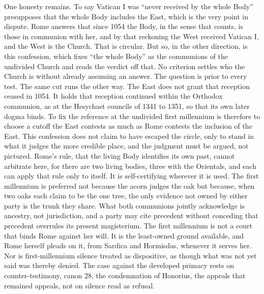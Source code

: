 \documentclass[11pt,twoside]{article}
\newcommand{\unit}[1]{\needspace{3\baselineskip}\par\medskip{\normalfont\bfseries\color{subhead}#1}\par\nobreak\smallskip}
\begin{document}
\unit{On the circle both sides stand in.}
One honesty remains. To say Vatican I was ``never received by the whole Body'' presupposes that the whole Body includes the East, which is the very point in dispute. Rome answers that since 1054 the Body, in the sense that counts, is those in communion with her, and by that reckoning the West received Vatican I, and the West is the Church. That is circular. But so, in the other direction, is this confession, which fixes ``the whole Body'' as the communions of the undivided Church and reads the verdict off that. No criterion settles who the Church is without already assuming an answer. The question is prior to every test. The same cut runs the other way. The East does not grant that reception ceased in 1054. It holds that reception continued within the Orthodox communion, as at the Hesychast councils of 1341 to 1351, so that its own later dogma binds. To fix the reference at the undivided first millennium is therefore to choose a cutoff the East contests as much as Rome contests the inclusion of the East. This confession does not claim to have escaped the circle, only to stand in what it judges the more credible place, and the judgment must be argued, not pictured. Rome's rule, that the living Body identifies its own past, cannot arbitrate here, for there are two living bodies, three with the Orientals, and each can apply that rule only to itself. It is self-certifying wherever it is used. The first millennium is preferred not because the acorn judges the oak but because, when two oaks each claim to be the one tree, the only evidence not owned by either party is the trunk they share. What both communions jointly acknowledge is ancestry, not jurisdiction, and a party may cite precedent without conceding that precedent overrules its present magisterium. The first millennium is not a court that binds Rome against her will. It is the least-owned ground available, and Rome herself pleads on it, from Sardica and Hormisdas, whenever it serves her. Nor is first-millennium silence treated as dispositive, as though what was not yet said was thereby denied. The case against the developed primacy rests on counter-testimony, canon 28, the condemnation of Honorius, the appeals that remained appeals, not on silence read as refusal.
\end{document}
